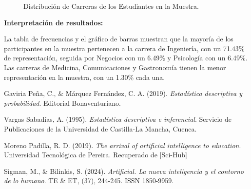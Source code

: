 \documentclass{article}
\begin{document}
\begin{figure}[H]
  \centering
  \caption{Distribución de Carreras de los Estudiantes en la Muestra.}
  \label{fig:carreras-frecuencias}
\end{figure}

\textbf{Interpretación de resultados:}

La tabla de frecuencias y el gráfico de barras muestran que la mayoría de los participantes en la muestra pertenecen a la carrera de Ingeniería, con un 71.43\% de representación, seguida por Negocios con un 6.49\% y Psicología con un 6.49\%. Las carreras de Medicina, Comunicaciones y Gastronomía tienen la menor representación en la muestra, con un 1.30\% cada una.

\newpage

\begin{thebibliography}{9}

  Gaviria Peña, C., \& Márquez Fernández, C. A. (2019). \textit{Estadística descriptiva y probabilidad}. Editorial Bonaventuriano. 
  
  Vargas Sabadías, A. (1995). \textit{Estadística descriptiva e inferencial}. Servicio de Publicaciones de la Universidad de Castilla-La Mancha, Cuenca.

  Moreno Padilla, R. D. (2019). \textit{The arrival of artificial intelligence to education}. Universidad Tecnológica de Pereira. Recuperado de [Sci-Hub]

  Sigman, M., \& Bilinkis, S. (2024). \textit{Artificial. La nueva inteligencia y el contorno de lo humano}. TE \& ET, (37), 244-245. ISSN 1850-9959.

\end{thebibliography}
\end{document}
